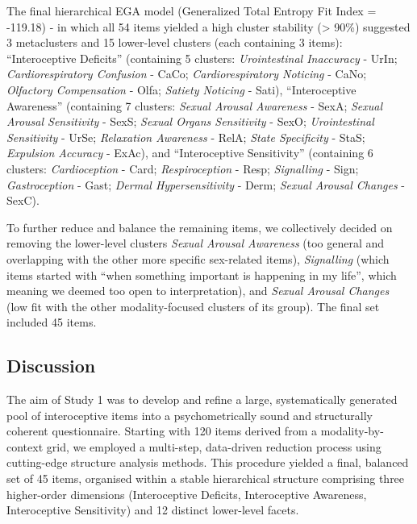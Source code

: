 \documentclass[
  jou,
  floatsintext,
  longtable,
  nolmodern,
  notxfonts,
  notimes,
  colorlinks=true,linkcolor=blue,citecolor=blue,urlcolor=blue]{apa7}
\begin{document}
The final hierarchical EGA model (Generalized Total Entropy Fit Index =
-119.18) - in which all 54 items yielded a high cluster stability
(\textgreater{} 90\%) suggested 3 metaclusters and 15 lower-level
clusters (each containing 3 items): ``Interoceptive Deficits''
(containing 5 clusters: \emph{Urointestinal Inaccuracy} - UrIn;
\emph{Cardiorespiratory Confusion} - CaCo; \emph{Cardiorespiratory
Noticing} - CaNo; \emph{Olfactory Compensation} - Olfa; \emph{Satiety
Noticing} - Sati), ``Interoceptive Awareness'' (containing 7 clusters:
\emph{Sexual Arousal Awareness} - SexA; \emph{Sexual Arousal
Sensitivity} - SexS; \emph{Sexual Organs Sensitivity} - SexO;
\emph{Urointestinal Sensitivity} - UrSe; \emph{Relaxation Awareness} -
RelA; \emph{State Specificity} - StaS; \emph{Expulsion Accuracy} -
ExAc), and ``Interoceptive Sensitivity'' (containing 6 clusters:
\emph{Cardioception} - Card; \emph{Respiroception} - Resp;
\emph{Signalling} - Sign; \emph{Gastroception} - Gast; \emph{Dermal
Hypersensitivity} - Derm; \emph{Sexual Arousal Changes} - SexC).

To further reduce and balance the remaining items, we collectively
decided on removing the lower-level clusters \emph{Sexual Arousal
Awareness} (too general and overlapping with the other more specific
sex-related items), \emph{Signalling} (which items started with ``when
something important is happening in my life'', which meaning we deemed
too open to interpretation), and \emph{Sexual Arousal Changes} (low fit
with the other modality-focused clusters of its group). The final set
included 45 items.

\subsection{Discussion}\label{discussion}

The aim of Study 1 was to develop and refine a large, systematically
generated pool of interoceptive items into a psychometrically sound and
structurally coherent questionnaire. Starting with 120 items derived
from a modality-by-context grid, we employed a multi-step, data-driven
reduction process using cutting-edge structure analysis methods. This
procedure yielded a final, balanced set of 45 items, organised within a
stable hierarchical structure comprising three higher-order dimensions
(Interoceptive Deficits, Interoceptive Awareness, Interoceptive
Sensitivity) and 12 distinct lower-level facets.
\end{document}
